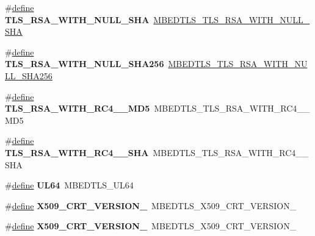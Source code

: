 \begin{DoxyCompactItemize}
\item 
\mbox{\label{compat-1_83_8h_aa0fa765ca865efb1dcb16a7934499e55}} 
\#\hyperlink{structdefine}{define} {\bfseries T\+L\+S\+\_\+\+R\+S\+A\+\_\+\+W\+I\+T\+H\+\_\+\+N\+U\+L\+L\+\_\+\+S\+HA}~\hyperlink{ssl__ciphersuites_8h_a19b23eeb8a05be325878ca1a4f74c372}{M\+B\+E\+D\+T\+L\+S\+\_\+\+T\+L\+S\+\_\+\+R\+S\+A\+\_\+\+W\+I\+T\+H\+\_\+\+N\+U\+L\+L\+\_\+\+S\+HA}
\item 
\mbox{\label{compat-1_83_8h_ae388fc0dbac04b3d5717fd447eaec61d}} 
\#\hyperlink{structdefine}{define} {\bfseries T\+L\+S\+\_\+\+R\+S\+A\+\_\+\+W\+I\+T\+H\+\_\+\+N\+U\+L\+L\+\_\+\+S\+H\+A256}~\hyperlink{ssl__ciphersuites_8h_a788470161a09d2200ad462a557db2c1f}{M\+B\+E\+D\+T\+L\+S\+\_\+\+T\+L\+S\+\_\+\+R\+S\+A\+\_\+\+W\+I\+T\+H\+\_\+\+N\+U\+L\+L\+\_\+\+S\+H\+A256}
\item 
\mbox{\label{compat-1_83_8h_a29697092bb88cacb9c5306be52beeefc}} 
\#\hyperlink{structdefine}{define} {\bfseries T\+L\+S\+\_\+\+R\+S\+A\+\_\+\+W\+I\+T\+H\+\_\+\+R\+C4\+\_\+\_\+\+M\+D5}~M\+B\+E\+D\+T\+L\+S\+\_\+\+T\+L\+S\+\_\+\+R\+S\+A\+\_\+\+W\+I\+T\+H\+\_\+\+R\+C4\+\_\+\_\+\+M\+D5
\item 
\mbox{\label{compat-1_83_8h_aba17cf5182609e28dca3c493ac066734}} 
\#\hyperlink{structdefine}{define} {\bfseries T\+L\+S\+\_\+\+R\+S\+A\+\_\+\+W\+I\+T\+H\+\_\+\+R\+C4\+\_\+\_\+\+S\+HA}~M\+B\+E\+D\+T\+L\+S\+\_\+\+T\+L\+S\+\_\+\+R\+S\+A\+\_\+\+W\+I\+T\+H\+\_\+\+R\+C4\+\_\+\_\+\+S\+HA
\item 
\mbox{\label{compat-1_83_8h_a72debc8d53da8731673da89e064d4e34}} 
\#\hyperlink{structdefine}{define} {\bfseries U\+L64}~M\+B\+E\+D\+T\+L\+S\+\_\+\+U\+L64
\item 
\mbox{\label{compat-1_83_8h_a803eb771dce23b32e873b94fa42ae3eb}} 
\#\hyperlink{structdefine}{define} {\bfseries X509\+\_\+\+C\+R\+T\+\_\+\+V\+E\+R\+S\+I\+O\+N\+\_}~M\+B\+E\+D\+T\+L\+S\+\_\+\+X509\+\_\+\+C\+R\+T\+\_\+\+V\+E\+R\+S\+I\+O\+N\+\_
\item 
\mbox{\label{compat-1_83_8h_aff0395a0a007c3515967f958879926cf}} 
\#\hyperlink{structdefine}{define} {\bfseries X509\+\_\+\+C\+R\+T\+\_\+\+V\+E\+R\+S\+I\+O\+N\+\_}~M\+B\+E\+D\+T\+L\+S\+\_\+\+X509\+\_\+\+C\+R\+T\+\_\+\+V\+E\+R\+S\+I\+O\+N\+\_

\end{DoxyCompactItemize}
